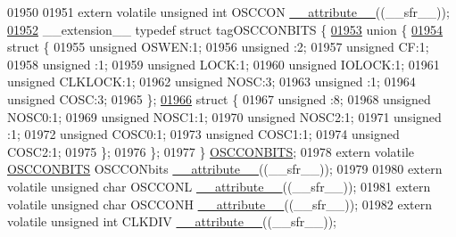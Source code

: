 \begin{DoxyCode}
01950 
01951 \textcolor{keyword}{extern} \textcolor{keyword}{volatile} \textcolor{keywordtype}{unsigned} \textcolor{keywordtype}{int}  OSCCON \hyperlink{a00009_a493c46f03454991ccc5aa7a6e1dfb2a7}{\_\_attribute\_\_}((\_\_sfr\_\_));
\hypertarget{a00009_source_l01952}{}\hyperlink{a00008}{01952} \_\_extension\_\_ \textcolor{keyword}{typedef} \textcolor{keyword}{struct }tagOSCCONBITS \{
\hypertarget{a00009_source_l01953}{}\hyperlink{a00009}{01953}   \textcolor{keyword}{union }\{
\hypertarget{a00009_source_l01954}{}\hyperlink{a00009}{01954}     \textcolor{keyword}{struct }\{
01955       \textcolor{keywordtype}{unsigned} OSWEN:1;
01956       \textcolor{keywordtype}{unsigned} :2;
01957       \textcolor{keywordtype}{unsigned} CF:1;
01958       \textcolor{keywordtype}{unsigned} :1;
01959       \textcolor{keywordtype}{unsigned} LOCK:1;
01960       \textcolor{keywordtype}{unsigned} IOLOCK:1;
01961       \textcolor{keywordtype}{unsigned} CLKLOCK:1;
01962       \textcolor{keywordtype}{unsigned} NOSC:3;
01963       \textcolor{keywordtype}{unsigned} :1;
01964       \textcolor{keywordtype}{unsigned} COSC:3;
01965     \};
\hypertarget{a00009_source_l01966}{}\hyperlink{a00009}{01966}     \textcolor{keyword}{struct }\{
01967       \textcolor{keywordtype}{unsigned} :8;
01968       \textcolor{keywordtype}{unsigned} NOSC0:1;
01969       \textcolor{keywordtype}{unsigned} NOSC1:1;
01970       \textcolor{keywordtype}{unsigned} NOSC2:1;
01971       \textcolor{keywordtype}{unsigned} :1;
01972       \textcolor{keywordtype}{unsigned} COSC0:1;
01973       \textcolor{keywordtype}{unsigned} COSC1:1;
01974       \textcolor{keywordtype}{unsigned} COSC2:1;
01975     \};
01976   \};
01977 \} \hyperlink{a00008_d4/d2a/a00632}{OSCCONBITS};
01978 \textcolor{keyword}{extern} \textcolor{keyword}{volatile} \hyperlink{a00008_d4/d2a/a00632}{OSCCONBITS} OSCCONbits \hyperlink{a00009_a493c46f03454991ccc5aa7a6e1dfb2a7}{\_\_attribute\_\_}((\_\_sfr\_\_));
01979 
01980 \textcolor{keyword}{extern} \textcolor{keyword}{volatile} \textcolor{keywordtype}{unsigned} \textcolor{keywordtype}{char} OSCCONL \hyperlink{a00009_a493c46f03454991ccc5aa7a6e1dfb2a7}{\_\_attribute\_\_}((\_\_sfr\_\_));
01981 \textcolor{keyword}{extern} \textcolor{keyword}{volatile} \textcolor{keywordtype}{unsigned} \textcolor{keywordtype}{char} OSCCONH \hyperlink{a00009_a493c46f03454991ccc5aa7a6e1dfb2a7}{\_\_attribute\_\_}((\_\_sfr\_\_));
01982 \textcolor{keyword}{extern} \textcolor{keyword}{volatile} \textcolor{keywordtype}{unsigned} \textcolor{keywordtype}{int}  CLKDIV \hyperlink{a00009_a493c46f03454991ccc5aa7a6e1dfb2a7}{\_\_attribute\_\_}((\_\_sfr\_\_));

\end{DoxyCode}
